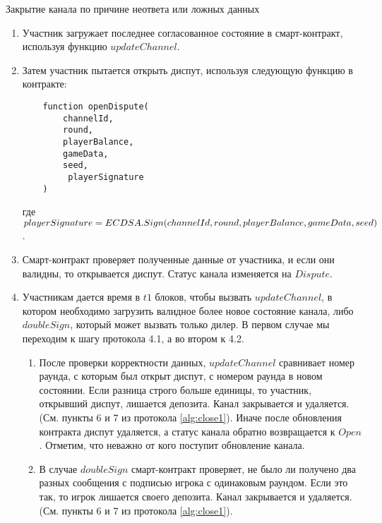 \begin{algorithm}
\caption{Закрытие канала по причине неответа или ложных данных} \label{alg:close4}
\begin{enumerate}
	\item Участник загружает последнее согласованное состояние в смарт-контракт, используя функцию $updateChannel$.
	\item Затем участник пытается открыть диспут, используя следующую функцию в контракте:
\begin{lstlisting}
    function openDispute(
        channelId,
        round,
        playerBalance,
        gameData,
        seed,
         playerSignature
    )
\end{lstlisting}
где $ playerSignature = ECDSA.Sign(channelId, round, \\ playerBalance, gameData, seed)$.
	\item Смарт-контракт проверяет полученные данные от участника, и если они валидны, то открывается диспут. Статус канала изменяется на $Dispute$.
	\item  Участникам дается время в $t1$ блоков, чтобы вызвать $updateChannel$, в котором необходимо загрузить валидное более новое состояние канала, либо $doubleSign$, который может вызвать только дилер. В первом случае мы переходим к шагу протокола 4.1, а во втором к 4.2.
\begin{enumerate}
	\item После проверки корректности данных, $updateChannel$ сравнивает номер раунда, с которым был открыт диспут, с номером раунда в новом состоянии. Если разница строго больше единицы, то участник, открывший диспут, лишается депозита. Канал закрывается и удаляется. (См. пункты 6 и 7 из протокола \autoref{alg:close1}). Иначе после обновления контракта диспут удаляется, а статус канала обратно возвращается к $Open$. Отметим, что неважно от кого поступит обновление канала. \label{upd}
	\item  В случае $doubleSign$ смарт-контракт проверяет, не было ли получено два разных сообщения с подписью игрока с одинаковым раундом. Если это так, то игрок лишается своего депозита.  Канал закрывается и удаляется. (См. пункты 6 и 7 из протокола \autoref{alg:close1}). \label{dbl}
\end{enumerate}
\end{enumerate}
\end{algorithm}
